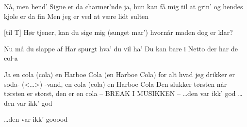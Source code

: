 \documentclass[a4paper,11pt]{article}
\begin{document}
\begin{song}



%
        Nå, men hend' Signe
        er da charmer'nde
        ja, hun kan få mig til at grin'
        og hendes kjole er da fin 
        Men jeg er ved at
        være lidt sulten 

[til T]%
        Hør tjener, kan du sige mig (sunget mar')
        hvornår maden dog er klar?

%
        Nu må du slappe af
        Har spurgt hva' du vil ha'
        Du kan bare i Netto
        der har de col-a


%
        Ja en cola (cola)
        en Harboe Cola (en Harboe Cola)
        for alt hvad jeg drikker er soda- (<{\ldots}>)
        -vand, en cola (cola)
        en Harboe Cola
        Den slukker tørsten når tørsten er størst, den
        er en cola
        -- BREAK I MUSIKKEN -- 
        {\ldots}den var ikk' god
        {\ldots}den var ikk' god

        {\ldots}den var ikk' gooood

\end{song}
\end{document}
